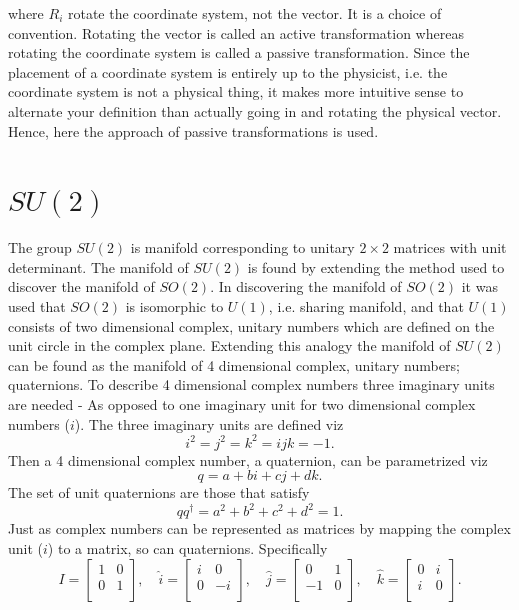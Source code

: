 where $R_i$ rotate the coordinate system, not the vector. It is a choice of convention. Rotating the vector is called an active transformation whereas rotating the coordinate system is called a passive transformation. Since the placement of a coordinate system is entirely up to the physicist, i.e. the coordinate system is not a physical thing, it makes more intuitive sense to alternate your definition than actually going in and rotating the physical vector. Hence, here the approach of passive transformations is used.

\section{$SU(2)$}
The group $SU(2)$ is manifold corresponding to unitary $2\times 2$ matrices with unit determinant. The manifold of $SU(2)$ is found by extending the method used to discover the manifold of $SO(2)$. In discovering the manifold of $SO(2)$ it was used that $SO(2)$ is isomorphic to $U(1)$, i.e. sharing manifold, and that $U(1)$ consists of two dimensional complex, unitary numbers which are defined on the unit circle in the complex plane. Extending this analogy the manifold of $SU(2)$ can be found as the manifold of 4 dimensional complex, unitary numbers; quaternions. To describe 4 dimensional complex numbers three imaginary units are needed - As opposed to one imaginary unit for two dimensional complex numbers ($i$). The three imaginary units are defined viz
\begin{equation}
	i^2=j^2=k^2=ijk=-1.
\end{equation} 
Then a 4 dimensional complex number, a quaternion, can be parametrized viz
\begin{equation}
	q=a+bi+cj+dk.
\end{equation} 
The set of unit quaternions are those that satisfy
\begin{equation}
	qq^\dagger=a^2+b^2+c^2+d^2=1.
\end{equation} 
Just as complex numbers can be represented as matrices by mapping the complex unit ($i$) to a matrix, so can quaternions. Specifically~\citep{Schwichtenberg2015}
\begin{equation}
	I=\begin{bmatrix}
		1 & 0\\
		0 & 1\\
	\end{bmatrix}, \quad \hat{i}=\begin{bmatrix}
		i & 0 \\
		0 & -i \\
	\end{bmatrix}, \quad \hat{j}=\begin{bmatrix}
		0 & 1\\
		-1 & 0 \\
	\end{bmatrix}, \quad \hat{k}=\begin{bmatrix}
		0 & i \\
		i & 0 \\
	\end{bmatrix}.
\end{equation} 
